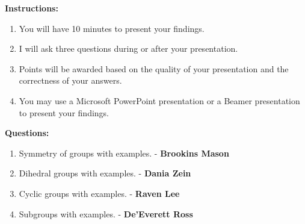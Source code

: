 \documentclass[11pt]{book}
\begin{document}
\thispagestyle{fancy}
\hfill
\vspace{0.3in}

\textbf{Instructions:}

\begin{enumerate}
    \item You will have 10 minutes to present your findings.
    \item I will ask three questions during or after your presentation.
    \item Points will be awarded based on the quality of your presentation and the correctness of your answers.
    \item You may use a Microsoft PowerPoint presentation or a Beamer presentation to present your findings.
\end{enumerate}

\textbf{Questions:}

\begin{enumerate}
    \item Symmetry of groups with examples. - \textbf{Brookins Mason}
    \item Dihedral groups with examples. - \textbf{Dania Zein}
    \item Cyclic groups with examples. - \textbf{Raven Lee}
    \item Subgroups with examples. - \textbf{De'Everett Ross}
\end{enumerate}
\end{document}
